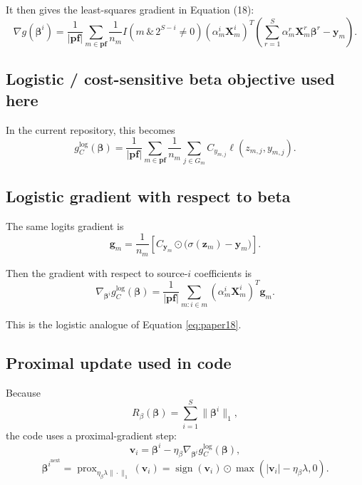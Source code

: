 \documentclass[11pt]{article}
\newcommand{\pf}{\mathbf{pf}}
\newcommand{\Xm}{\mathbf{X}_m}
\newcommand{\ym}{\mathbf{y}_m}
\newcommand{\zm}{\mathbf{z}_m}
\newcommand{\betai}{\boldsymbol{\beta}^i}
\newcommand{\betavec}{\boldsymbol{\beta}}
\newcommand{\sigmoid}{\sigma}
\begin{document}
It then gives the least-squares gradient in Equation (18):
\begin{equation}
\label{eq:paper18}
\nabla g(\betai)
=
\frac{1}{|\pf|}
\sum_{m \in \pf}
\frac{1}{n_m}
I(m \,\&\, 2^{S-i} \ne 0)
(\alpha_m^i \Xm^i)^T
\left(
\sum_{r=1}^{S}
\alpha_m^r \Xm^r \boldsymbol{\beta}^r
- \ym
\right).
\end{equation}

\subsection{Logistic / cost-sensitive beta objective used here}

In the current repository, this becomes
\begin{equation}
\label{eq:beta-logistic-objective}
g_C^{\mathrm{log}}(\betavec)
=
\frac{1}{|\pf|}
\sum_{m \in \pf}
\frac{1}{n_m}
\sum_{j \in G_m}
C_{y_{m,j}}
\ell(z_{m,j}, y_{m,j}).
\end{equation}

\subsection{Logistic gradient with respect to beta}

The same logits gradient is
\begin{equation}
\label{eq:beta-gm}
\mathbf{g}_m
=
\frac{1}{n_m}
\left[
C_{\mathbf{y}_m}
\odot
\big(\sigmoid(\zm) - \ym\big)
\right].
\end{equation}

Then the gradient with respect to source-$i$ coefficients is
\begin{equation}
\label{eq:beta-gradient-logistic}
\nabla_{\betai} g_C^{\mathrm{log}}(\betavec)
=
\frac{1}{|\pf|}
\sum_{m : i \in m}
(\alpha_m^i \Xm^i)^T \mathbf{g}_m.
\end{equation}

This is the logistic analogue of Equation \eqref{eq:paper18}.

\subsection{Proximal update used in code}

Because
\begin{equation}
\label{eq:beta-l1-choice}
R_{\beta}(\betavec)
=
\sum_{i=1}^{S} \|\betai\|_1,
\end{equation}
the code uses a proximal-gradient step:
\begin{equation}
\label{eq:beta-v}
\mathbf{v}_i
=
\betai
- \eta_{\beta}
\nabla_{\betai} g_C^{\mathrm{log}}(\betavec),
\end{equation}
\begin{equation}
\label{eq:beta-prox}
\betai^{\mathrm{next}}
=
\operatorname{prox}_{\eta_{\beta}\lambda \|\cdot\|_1}(\mathbf{v}_i)
=
\operatorname{sign}(\mathbf{v}_i)
\odot
\max(|\mathbf{v}_i| - \eta_{\beta}\lambda, 0).
\end{equation}
\end{document}
